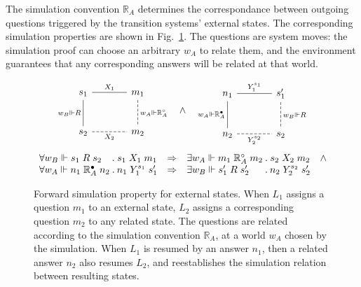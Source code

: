 \documentclass[acmsmall,authordraft]{acmart}
\newcommand{\que}{\circ}
\newcommand{\ans}{\bullet}
\begin{document}
The simulation convention $\mathbb{R}_A$
determines the correspondance between
outgoing questions triggered by
the transition systems' external states.
The corresponding simulation properties
are shown in Fig.~\ref{fig:fsim-ext}.
The questions are system moves:
the simulation proof can choose an arbitrary $w_A$ to relate them,
and the environment guarantees that any corresponding answers
will be related at that world.

\begin{figure} %
  \[
    \begin{array}{ccc}
      \begin{tikzcd}[sep=large]
        s_1 \ar[r, "X_1", dash] \ar[d, "w_B \Vdash R"', dash] &
        m_1 \ar[d, "w_A \Vdash \mathbb{R}_A^\que", dash, dashed] \\
        s_2 \ar[r, "X_2"', dash, dashed] &
        m_2
      \end{tikzcd}
      &
      \wedge
      &
      \begin{tikzcd}[sep=large]
        n_1 \ar[r, "Y_1^{s_1}", dash] \ar[d, "w_A \Vdash \mathbb{R}_A^\ans"', dash] &
        s_1' \ar[d, "w_B \Vdash R", dash, dashed] \\
        n_2 \ar[r, "Y_2^{s_2}"', dash, dashed] &
        s_2
      \end{tikzcd}
    \end{array}
  \]
  \[
        \begin{array}{l@{\:}c@{\:}ccl@{\:}c@{\:}cc}
          \forall w_B \Vdash s_1 \mathrel{R} s_2 & . &
                  s_1 \mathrel{X_1} m_1 & \Rightarrow &
          \exists w_A \Vdash m_1 \mathrel{\mathbb{R}_A^\que} m_2 & . &
                  s_2 \mathrel{X_2} m_2 & \wedge \\
          \forall w_A \Vdash n_1 \mathrel{\mathbb{R}_A^\ans} n_2 & . &
                  n_1 \mathrel{Y_1^{s_1}} s_1' & \Rightarrow &
          \exists w_B \Vdash s_1' \mathrel{R} s_2' & . &
                  n_2 \mathrel{Y_2^{s_2}} s_2' &
        \end{array}
  \]
  \caption{Forward simulation property for external states.
    When $L_1$ assigns a question $m_1$ to an external state,
    $L_2$ assigns a corresponding question $m_2$ to any related state.
    The questions are related according to
    the simulation convention $\mathbb{R}_A$,
    at a world $w_A$ chosen by the simulation.
    When $L_1$ is resumed by an answer $n_1$,
    then a related answer $n_2$ also resumes $L_2$,
    and reestablishes the simulation relation
    between resulting states.}
  \label{fig:fsim-ext}
\end{figure}
\end{document}

